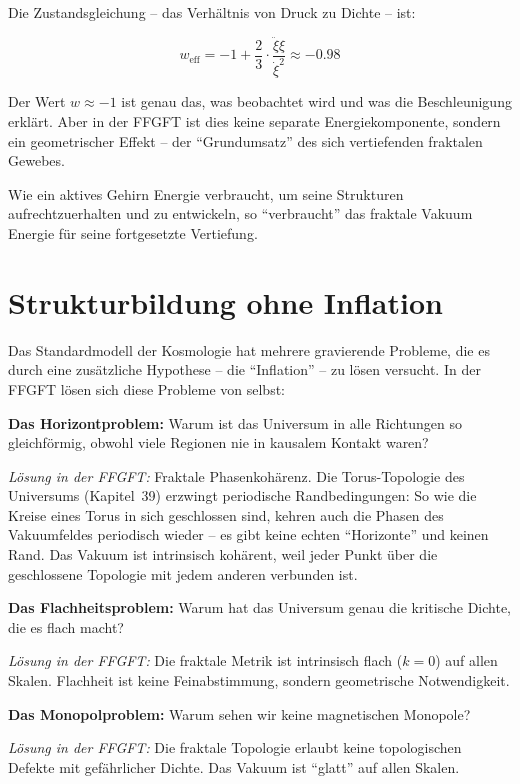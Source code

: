 Die Zustandsgleichung -- das Verhältnis von Druck zu Dichte -- ist:

\begin{equation}
w_{\text{eff}} = -1 + \frac{2}{3} \cdot \frac{\ddot{\xi}\xi}{\dot{\xi}^2} \approx -0.98
\end{equation}

Der Wert $w \approx -1$ ist genau das, was beobachtet wird und was die Beschleunigung erklärt. Aber in der FFGFT ist dies keine separate Energiekomponente, sondern ein geometrischer Effekt -- der \enquote{Grundumsatz} des sich vertiefenden fraktalen Gewebes.

Wie ein aktives Gehirn Energie verbraucht, um seine Strukturen aufrechtzuerhalten und zu entwickeln, so \enquote{verbraucht} das fraktale Vakuum Energie für seine fortgesetzte Vertiefung.

\section{Strukturbildung ohne Inflation}

Das Standardmodell der Kosmologie hat mehrere gravierende Probleme, die es durch eine zusätzliche Hypothese -- die \enquote{Inflation} -- zu lösen versucht. In der FFGFT lösen sich diese Probleme von selbst:

\textbf{Das Horizontproblem:} Warum ist das Universum in alle Richtungen so gleichförmig, obwohl viele Regionen nie in kausalem Kontakt waren?

\textit{Lösung in der FFGFT:} Fraktale Phasenkohärenz. Die Torus-Topologie des Universums (Kapitel~39) erzwingt periodische Randbedingungen: So wie die Kreise eines Torus in sich geschlossen sind, kehren auch die Phasen des Vakuumfeldes periodisch wieder -- es gibt keine echten \enquote{Horizonte} und keinen Rand. Das Vakuum ist intrinsisch kohärent, weil jeder Punkt über die geschlossene Topologie mit jedem anderen verbunden ist.

\textbf{Das Flachheitsproblem:} Warum hat das Universum genau die kritische Dichte, die es flach macht?

\textit{Lösung in der FFGFT:} Die fraktale Metrik ist intrinsisch flach ($k=0$) auf allen Skalen. Flachheit ist keine Feinabstimmung, sondern geometrische Notwendigkeit.

\textbf{Das Monopolproblem:} Warum sehen wir keine magnetischen Monopole?

\textit{Lösung in der FFGFT:} Die fraktale Topologie erlaubt keine topologischen Defekte mit gefährlicher Dichte. Das Vakuum ist \enquote{glatt} auf allen Skalen.

